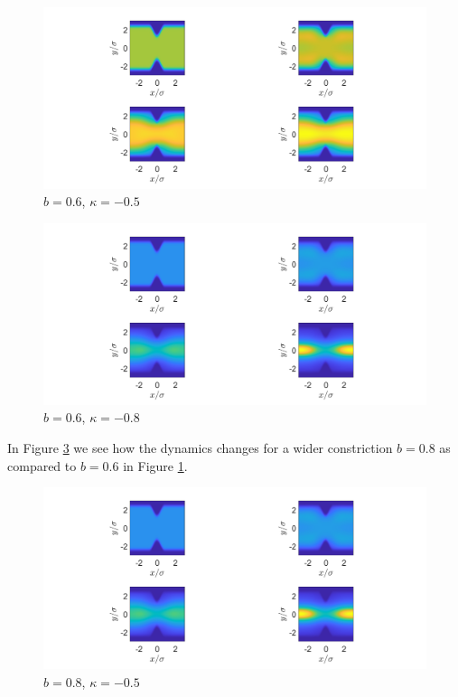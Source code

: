 \documentclass[11pt, a4paper]{article}
\theoremstyle{definition}
\begin{document}
\begin{figure}[h]
	\centering
	\includegraphics[scale=0.4]{Con2.png}
	\caption{$b = 0.6$, $\kappa =-0.5$} 
	\label{F1b}
\end{figure}
\begin{figure}[h]
	\centering
	\includegraphics[scale=0.4]{Con3.png}
	\caption{$b = 0.6$, $\kappa =-0.8$} 
	\label{F1c}
\end{figure}
In Figure \ref{F2a} we see how the dynamics changes for a wider constriction $b = 0.8$ as compared to $b = 0.6$ in Figure \ref{F1b}.
\begin{figure}[h]
	\centering
	\includegraphics[scale=0.4]{Con3.png}
	\caption{$b = 0.8$, $\kappa =-0.5$} 
	\label{F2a}
\end{figure}
\end{document}
